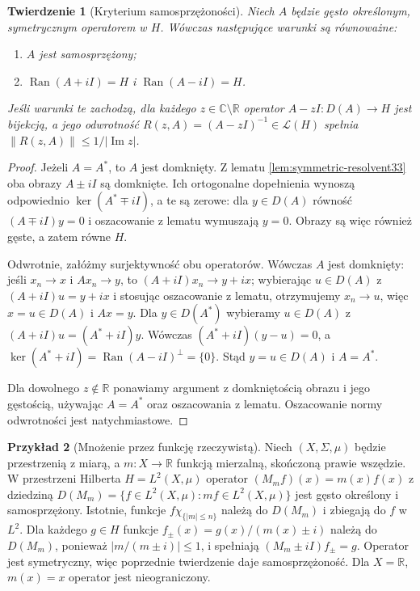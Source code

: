 \documentclass[11pt,a4paper]{article}
\numberwithin{equation}{section}
\theoremstyle{plain}
\newtheorem{twierdzenie}{Twierdzenie}[section]
\theoremstyle{definition}
\newtheorem{przyklad}[twierdzenie]{Przykład}
\theoremstyle{remark}
\newcommand{\R}{\mathbb R}
\newcommand{\C}{\mathbb C}
\begin{document}
\begin{twierdzenie}[Kryterium samosprzężoności]
\label{thm:selfadjoint-range33}
Niech $A$ będzie gęsto określonym, symetrycznym operatorem w $H$.
Wówczas następujące warunki są równoważne:
\begin{enumerate}[label=\textup{(\roman*)}]
\item $A$ jest samosprzężony;
\item $\operatorname{Ran}(A+iI)=H$ i $\operatorname{Ran}(A-iI)=H$.
\end{enumerate}
Jeśli warunki te zachodzą, dla każdego $z\in\C\setminus\R$
operator $A-zI:D(A)\to H$ jest bijekcją, a jego odwrotność
$R(z,A)=(A-zI)^{-1}\in\mathcal L(H)$ spełnia
$\|R(z,A)\|\le1/|\operatorname{Im}z|$.
\end{twierdzenie}
\begin{proof}
Jeżeli $A=A^*$, to $A$ jest domknięty. Z lematu
\ref{lem:symmetric-resolvent33} oba obrazy $A\pm iI$ są domknięte.
Ich ortogonalne dopełnienia wynoszą odpowiednio
$\ker(A^*\mp iI)$, a te są zerowe: dla $y\in D(A)$
równość $(A\mp iI)y=0$ i oszacowanie z lematu wymuszają $y=0$.
Obrazy są więc również gęste, a zatem równe $H$.

Odwrotnie, załóżmy surjektywność obu operatorów.
Wówczas $A$ jest domknięty: jeśli $x_n\to x$ i $Ax_n\to y$,
to $(A+iI)x_n\to y+ix$; wybierając $u\in D(A)$
z $(A+iI)u=y+ix$ i stosując oszacowanie z lematu,
otrzymujemy $x_n\to u$, więc $x=u\in D(A)$ i $Ax=y$.
Dla $y\in D(A^*)$ wybieramy $u\in D(A)$ z
$(A+iI)u=(A^*+iI)y$. Wówczas
$(A^*+iI)(y-u)=0$, a
$\ker(A^*+iI)=\operatorname{Ran}(A-iI)^\perp=\{0\}$.
Stąd $y=u\in D(A)$ i $A=A^*$.

Dla dowolnego $z\notin\R$ ponawiamy argument z domkniętością
obrazu i jego gęstością, używając $A=A^*$ oraz oszacowania
z lematu. Oszacowanie normy odwrotności jest natychmiastowe.
\end{proof}

\begin{przyklad}[Mnożenie przez funkcję rzeczywistą]
\label{ex:mult-unbounded33}
Niech $(X,\Sigma,\mu)$ będzie przestrzenią z miarą, a
$m:X\to\R$ funkcją mierzalną, skończoną prawie wszędzie.
W przestrzeni Hilberta $H=L^2(X,\mu)$ operator
$(M_mf)(x)=m(x)f(x)$ z dziedziną
$D(M_m)=\{f\in L^2(X,\mu):mf\in L^2(X,\mu)\}$
jest gęsto określony i samosprzężony. Istotnie, funkcje
$f\chi_{\{|m|\le n\}}$ należą do $D(M_m)$ i zbiegają do $f$
w $L^2$. Dla każdego $g\in H$ funkcje
$f_\pm(x)=g(x)/(m(x)\pm i)$ należą do $D(M_m)$,
ponieważ $|m/(m\pm i)|\le1$, i spełniają
$(M_m\pm iI)f_\pm=g$. Operator jest symetryczny, więc
poprzednie twierdzenie daje samosprzężoność.
Dla $X=\R$, $m(x)=x$ operator jest nieograniczony.
\end{przyklad}
\end{document}
